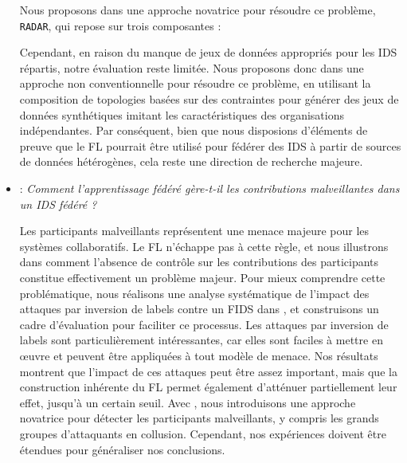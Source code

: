 \begin{itemize}[listparindent=\parindent,itemsep=.6\baselineskip]
  Nous proposons dans  une approche novatrice pour résoudre ce problème, \texttt{RADAR}, qui repose sur trois composantes :  
  Cependant, en raison du manque de jeux de données appropriés pour les IDS répartis, notre évaluation reste limitée.  
  Nous proposons donc dans  une approche non conventionnelle pour résoudre ce problème, en utilisant la composition de topologies basées sur des contraintes pour générer des jeux de données synthétiques imitant les caractéristiques des organisations indépendantes.  
  Par conséquent, bien que nous disposions d'éléments de preuve que le FL pourrait être utilisé pour fédérer des IDS à partir de sources de données hétérogènes, cela reste une direction de recherche majeure.

  \item {} : \emph{Comment l'apprentissage fédéré gère-t-il les contributions malveillantes dans un IDS fédéré ?}

  Les participants malveillants représentent une menace majeure pour les systèmes collaboratifs.  
  Le FL n'échappe pas à cette règle, et nous illustrons dans  comment l'absence de contrôle sur les contributions des participants constitue effectivement un problème majeur.  
  Pour mieux comprendre cette problématique, nous réalisons une analyse systématique de l'impact des attaques par inversion de labels contre un FIDS dans , et construisons un cadre d'évaluation pour faciliter ce processus.  
  Les attaques par inversion de labels sont particulièrement intéressantes, car elles sont faciles à mettre en œuvre et peuvent être appliquées à tout modèle de menace.  
  Nos résultats montrent que l'impact de ces attaques peut être assez important, mais que la construction inhérente du FL permet également d'atténuer partiellement leur effet, jusqu'à un certain seuil.  
  Avec , nous introduisons une approche novatrice pour détecter les participants malveillants, y compris les grands groupes d'attaquants en collusion.  
  Cependant, nos expériences doivent être étendues pour généraliser nos conclusions.


\end{itemize}
